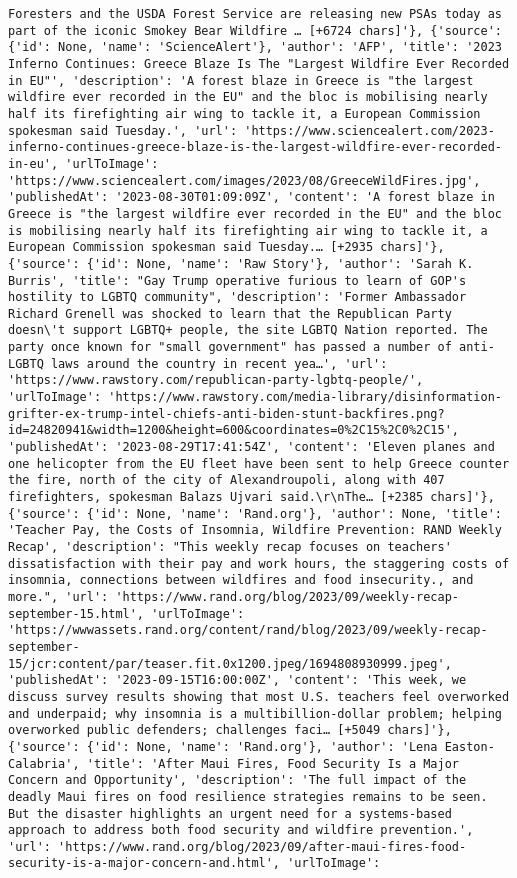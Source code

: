 \documentclass[
  letterpaper,
  DIV=11,
  numbers=noendperiod]{scrartcl}
\begin{document}
\begin{verbatim}
Foresters and the USDA Forest Service are releasing new PSAs today as part of the iconic Smokey Bear Wildfire … [+6724 chars]'}, {'source': {'id': None, 'name': 'ScienceAlert'}, 'author': 'AFP', 'title': '2023 Inferno Continues: Greece Blaze Is The "Largest Wildfire Ever Recorded in EU"', 'description': 'A forest blaze in Greece is "the largest wildfire ever recorded in the EU" and the bloc is mobilising nearly half its firefighting air wing to tackle it, a European Commission spokesman said Tuesday.', 'url': 'https://www.sciencealert.com/2023-inferno-continues-greece-blaze-is-the-largest-wildfire-ever-recorded-in-eu', 'urlToImage': 'https://www.sciencealert.com/images/2023/08/GreeceWildFires.jpg', 'publishedAt': '2023-08-30T01:09:09Z', 'content': 'A forest blaze in Greece is "the largest wildfire ever recorded in the EU" and the bloc is mobilising nearly half its firefighting air wing to tackle it, a European Commission spokesman said Tuesday.… [+2935 chars]'}, {'source': {'id': None, 'name': 'Raw Story'}, 'author': 'Sarah K. Burris', 'title': "Gay Trump operative furious to learn of GOP's hostility to LGBTQ community", 'description': 'Former Ambassador Richard Grenell was shocked to learn that the Republican Party doesn\'t support LGBTQ+ people, the site LGBTQ Nation reported. The party once known for "small government" has passed a number of anti-LGBTQ laws around the country in recent yea…', 'url': 'https://www.rawstory.com/republican-party-lgbtq-people/', 'urlToImage': 'https://www.rawstory.com/media-library/disinformation-grifter-ex-trump-intel-chiefs-anti-biden-stunt-backfires.png?id=24820941&width=1200&height=600&coordinates=0%2C15%2C0%2C15', 'publishedAt': '2023-08-29T17:41:54Z', 'content': 'Eleven planes and one helicopter from the EU fleet have been sent to help Greece counter the fire, north of the city of Alexandroupoli, along with 407 firefighters, spokesman Balazs Ujvari said.\r\nThe… [+2385 chars]'}, {'source': {'id': None, 'name': 'Rand.org'}, 'author': None, 'title': 'Teacher Pay, the Costs of Insomnia, Wildfire Prevention: RAND Weekly Recap', 'description': "This weekly recap focuses on teachers' dissatisfaction with their pay and work hours, the staggering costs of insomnia, connections between wildfires and food insecurity., and more.", 'url': 'https://www.rand.org/blog/2023/09/weekly-recap-september-15.html', 'urlToImage': 'https://wwwassets.rand.org/content/rand/blog/2023/09/weekly-recap-september-15/jcr:content/par/teaser.fit.0x1200.jpeg/1694808930999.jpeg', 'publishedAt': '2023-09-15T16:00:00Z', 'content': 'This week, we discuss survey results showing that most U.S. teachers feel overworked and underpaid; why insomnia is a multibillion-dollar problem; helping overworked public defenders; challenges faci… [+5049 chars]'}, {'source': {'id': None, 'name': 'Rand.org'}, 'author': 'Lena Easton-Calabria', 'title': 'After Maui Fires, Food Security Is a Major Concern and Opportunity', 'description': 'The full impact of the deadly Maui fires on food resilience strategies remains to be seen. But the disaster highlights an urgent need for a systems-based approach to address both food security and wildfire prevention.', 'url': 'https://www.rand.org/blog/2023/09/after-maui-fires-food-security-is-a-major-concern-and.html', 'urlToImage': 
\end{verbatim}
\end{document}
